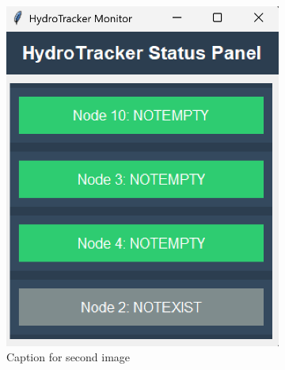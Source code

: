 \begin{figure}[H]
\begin{subfigure}[b]{0.45\linewidth}
        \includegraphics[width=\linewidth]{gui_images/gui_screenshot_2.png}
        \caption{Caption for second image}
        \label{fig:subfig2}
    \end{subfigure}
    \caption{}
    \label{fig:combined}
\end{figure}